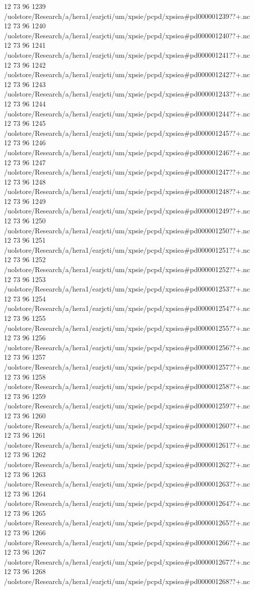 12 73 96
1239
/uolstore/Research/a/hera1/earjcti/um/xpsie/pcpd/xpsiea#pd000001239??+.nc
12 73 96
1240
/uolstore/Research/a/hera1/earjcti/um/xpsie/pcpd/xpsiea#pd000001240??+.nc
12 73 96
1241
/uolstore/Research/a/hera1/earjcti/um/xpsie/pcpd/xpsiea#pd000001241??+.nc
12 73 96
1242
/uolstore/Research/a/hera1/earjcti/um/xpsie/pcpd/xpsiea#pd000001242??+.nc
12 73 96
1243
/uolstore/Research/a/hera1/earjcti/um/xpsie/pcpd/xpsiea#pd000001243??+.nc
12 73 96
1244
/uolstore/Research/a/hera1/earjcti/um/xpsie/pcpd/xpsiea#pd000001244??+.nc
12 73 96
1245
/uolstore/Research/a/hera1/earjcti/um/xpsie/pcpd/xpsiea#pd000001245??+.nc
12 73 96
1246
/uolstore/Research/a/hera1/earjcti/um/xpsie/pcpd/xpsiea#pd000001246??+.nc
12 73 96
1247
/uolstore/Research/a/hera1/earjcti/um/xpsie/pcpd/xpsiea#pd000001247??+.nc
12 73 96
1248
/uolstore/Research/a/hera1/earjcti/um/xpsie/pcpd/xpsiea#pd000001248??+.nc
12 73 96
1249
/uolstore/Research/a/hera1/earjcti/um/xpsie/pcpd/xpsiea#pd000001249??+.nc
12 73 96
1250
/uolstore/Research/a/hera1/earjcti/um/xpsie/pcpd/xpsiea#pd000001250??+.nc
12 73 96
1251
/uolstore/Research/a/hera1/earjcti/um/xpsie/pcpd/xpsiea#pd000001251??+.nc
12 73 96
1252
/uolstore/Research/a/hera1/earjcti/um/xpsie/pcpd/xpsiea#pd000001252??+.nc
12 73 96
1253
/uolstore/Research/a/hera1/earjcti/um/xpsie/pcpd/xpsiea#pd000001253??+.nc
12 73 96
1254
/uolstore/Research/a/hera1/earjcti/um/xpsie/pcpd/xpsiea#pd000001254??+.nc
12 73 96
1255
/uolstore/Research/a/hera1/earjcti/um/xpsie/pcpd/xpsiea#pd000001255??+.nc
12 73 96
1256
/uolstore/Research/a/hera1/earjcti/um/xpsie/pcpd/xpsiea#pd000001256??+.nc
12 73 96
1257
/uolstore/Research/a/hera1/earjcti/um/xpsie/pcpd/xpsiea#pd000001257??+.nc
12 73 96
1258
/uolstore/Research/a/hera1/earjcti/um/xpsie/pcpd/xpsiea#pd000001258??+.nc
12 73 96
1259
/uolstore/Research/a/hera1/earjcti/um/xpsie/pcpd/xpsiea#pd000001259??+.nc
12 73 96
1260
/uolstore/Research/a/hera1/earjcti/um/xpsie/pcpd/xpsiea#pd000001260??+.nc
12 73 96
1261
/uolstore/Research/a/hera1/earjcti/um/xpsie/pcpd/xpsiea#pd000001261??+.nc
12 73 96
1262
/uolstore/Research/a/hera1/earjcti/um/xpsie/pcpd/xpsiea#pd000001262??+.nc
12 73 96
1263
/uolstore/Research/a/hera1/earjcti/um/xpsie/pcpd/xpsiea#pd000001263??+.nc
12 73 96
1264
/uolstore/Research/a/hera1/earjcti/um/xpsie/pcpd/xpsiea#pd000001264??+.nc
12 73 96
1265
/uolstore/Research/a/hera1/earjcti/um/xpsie/pcpd/xpsiea#pd000001265??+.nc
12 73 96
1266
/uolstore/Research/a/hera1/earjcti/um/xpsie/pcpd/xpsiea#pd000001266??+.nc
12 73 96
1267
/uolstore/Research/a/hera1/earjcti/um/xpsie/pcpd/xpsiea#pd000001267??+.nc
12 73 96
1268
/uolstore/Research/a/hera1/earjcti/um/xpsie/pcpd/xpsiea#pd000001268??+.nc
